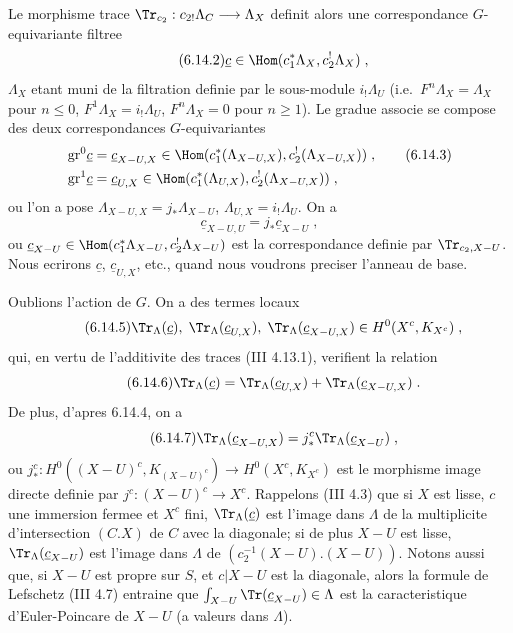 Le morphisme trace $\Tr_{c_2} : c_{2!}\Lambda_C \longrightarrow \Lambda_X$ definit alors une correspondance $G$-equivariante filtree
\begin{equation}\tag{6.14.2}
\underline{c} \in \Hom(c_1^*\Lambda_X, c_2^{!\,}\Lambda_X)\;,
\end{equation}
$\Lambda_X$ etant muni de la filtration definie par le sous-module $i_!\Lambda_U$ (i.e.\ $F^n\Lambda_X = \Lambda_X$ pour $n \leq 0$, $F^1\Lambda_X = i_!\Lambda_U$, $F^n\Lambda_X = 0$ pour $n \geq 1$). Le gradue associe se compose des deux correspondances $G$-equivariantes
\begin{align*}
\mathrm{gr}^0\underline{c} & = \underline{c}_{X-U,X} \in \Hom(c_1^*(\Lambda_{X-U,X}), c_2^{!\,}(\Lambda_{X-U,X}))\;, \tag{6.14.3} \\
\mathrm{gr}^1\underline{c} & = \underline{c}_{U,X} \in \Hom(c_1^*(\Lambda_{U,X}), c_2^{!\,}(\Lambda_{X-U,X}))\;,
\end{align*}
ou l'on a pose $\Lambda_{X-U,X} = j_*\Lambda_{X-U}$, $\Lambda_{U,X} = i_!\Lambda_U$. On a
\begin{equation}\tag{6.14.4}
\underline{c}_{X-U,U} = j_*\underline{c}_{X-U}\;,
\end{equation}
ou $\underline{c}_{X-U} \in \Hom(c_1^*\Lambda_{X-U}, c_2^{!\,}\Lambda_{X-U})$ est la correspondance definie par $\Tr_{c_2,X-U}$. Nous ecrirons $\underline{c}$, $\underline{c}_{U,X}$, etc., quand nous voudrons preciser l'anneau de base.

Oublions l'action de $G$. On a des termes locaux
\begin{equation}\tag{6.14.5}
\Tr_\Lambda(\underline{c}),\; \Tr_\Lambda(\underline{c}_{U,X}),\; \Tr_\Lambda(\underline{c}_{X-U,X}) \in H^0(X^c, K_{X^c})\;,
\end{equation}
qui, en vertu de l'additivite des traces (III 4.13.1), verifient la relation
\begin{equation}\tag{6.14.6}
\Tr_\Lambda(\underline{c}) = \Tr_\Lambda(\underline{c}_{U,X}) + \Tr_\Lambda(\underline{c}_{X-U,X})\;.
\end{equation}
De plus, d'apres 6.14.4, on a
\begin{equation}\tag{6.14.7}
\Tr_\Lambda(\underline{c}_{X-U,X}) = j_*^c\Tr_\Lambda(\underline{c}_{X-U})\;,
\end{equation}
ou $j_*^c : H^0((X-U)^c, K_{(X-U)^c}) \longrightarrow H^0(X^c, K_{X^c})$ est le morphisme image directe definie par $j^c : (X-U)^c \longrightarrow X^c$. Rappelons (III 4.3) que si $X$ est lisse, $c$ une immersion fermee et $X^c$ fini, $\Tr_\Lambda(\underline{c})$ est l'image dans $\Lambda$ de la multiplicite d'intersection $(C.X)$ de $C$ avec la diagonale; si de plus $X-U$ est lisse, $\Tr_\Lambda(\underline{c}_{X-U})$ est l'image dans $\Lambda$ de $(c_2^{-1}(X-U).(X-U))$. Notons aussi que, si $X-U$ est propre sur $S$, et $c|X-U$ est la diagonale, alors la formule de Lefschetz (III 4.7) entraine que $\int_{X-U} \Tr(\underline{c}_{X-U}) \in \Lambda$ est la caracteristique d'Euler-Poincare de $X-U$ (a valeurs dans $\Lambda$).


